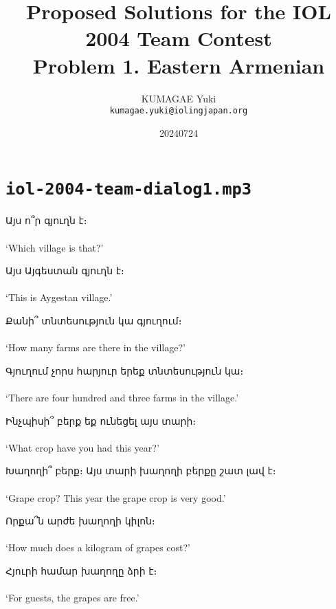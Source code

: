 \documentclass[14pt]{extarticle}
\title{\Large Proposed Solutions for the IOL 2004 Team Contest\\\large Problem 1. Eastern Armenian}
\author{KUMAGAE Yuki\\
{\small\texttt{kumagae.yuki@iolingjapan.org}}}
\date{20240724}
\begin{document}
\pagestyle{empty}
\maketitle
\thispagestyle{empty}

\section*{\texttt{iol-2004-team-dialog1.mp3}}

\begin{exe}
\ex
\gll Այս ո՞ր գյուղն է։\\
[ɑjs vɔɾ ɡjuʁn ɛ]\\
\glt `Which village is that?'

\ex
\gll Այս Այգեստան գյուղն է։\\
[ɑjs ɑjɡɛstɑn ɡjuʁn ɛ]\\
\glt `This is Aygestan village.'

\ex
\gll Քանի՞ տնտեսություն կա գյուղում։\\
[kʰɑni təntɛsutʰjun kɑ ɡjuʁum]\\
\glt `How many farms are there in the village?'

\ex
\gll Գյուղում չորս հարյուր երեք տնտեսություն կա։\\
[ɡjuʁum t͡ʃʰɔɾs hɑɾjuɾ jɛɾɛkʰ təntɛsutʰjun kɑ]\\
\glt `There are four hundred and three farms in the village.'

\ex
\gll Ինչպիսի՞ բերք եք ունեցել այս տարի։\\
[int͡ʃʰpisi bɛɾkʰ ɛkʰ unɛt͡sʰɛl ɑjs tɑɾi]\\
\glt `What crop have you had this year?'

\ex
\gll Խաղողի՞ բերք։ Այս տարի խաղողի բերքը շատ լավ է։\\
[χɑʁɔʁi bɛɾkʰ ɑjs tɑɾi χɑʁɔʁi bɛɾkʰə ʃɑt lɑv ɛ]\\
\glt `Grape crop? This year the grape crop is very good.'

\ex
\gll Որքա՞ն արժե խաղողի կիլոն։\\
[vɔɾkʰɑn ɑɾʒɛ χɑʁɔʁi kilɔn]\\
\glt `How much does a kilogram of grapes cost?'

\ex
\gll Հյուրի համար խաղողը ձրի է։\\
[hjuɾi hɑmɑɾ χɑʁɔʁə d͡zəɾi ɛ]\\
\glt `For guests, the grapes are free.'
\end{exe}

\clearpage
\end{document}
